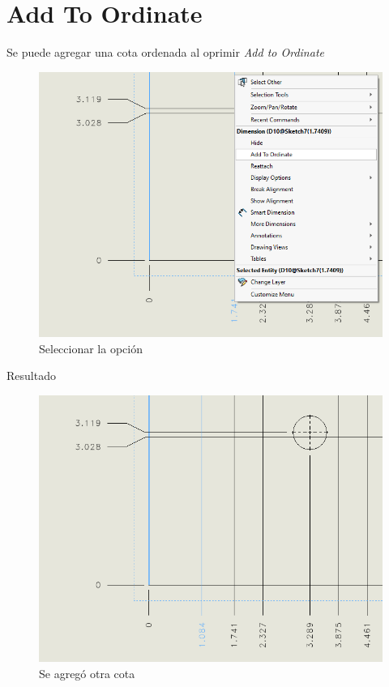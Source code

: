 \documentclass{report}
\begin{document}
\section{Add To Ordinate}

Se puede agregar una cota ordenada al oprimir \emph{Add to Ordinate}

\begin{figure}[H]
	\centering
	\includegraphics[width=0.85\linewidth, height=0.5\textheight,keepaspectratio]{Imagenes/solidworks_addtoordinate01}
	\caption{Seleccionar la opción}
	\label{fig:solidworksaddtoordinate01}
\end{figure}

\vskip50pt

{\LARGE Resultado}

\begin{figure}[H]
	\centering
	\includegraphics[width=0.85\linewidth, height=0.5\textheight,keepaspectratio]{Imagenes/solidworks_addtoordinate02}
	\caption{Se agregó otra cota}
	\label{fig:solidworksaddtoordinate02}
\end{figure}
\end{document}
